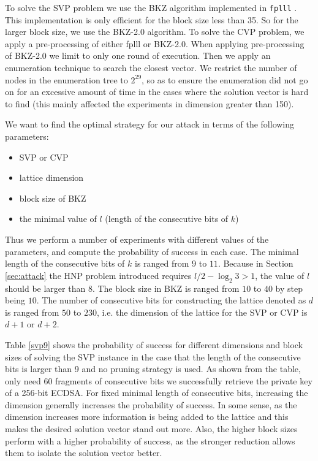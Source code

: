  To solve the SVP problem we use the BKZ algorithm implemented in \verb+fplll+ \cite{fplll}.
This implementation is only efficient for the block size less than 35.
So for the larger block size, we use the BKZ-2.0 \cite{bkz2} algorithm.
To solve the CVP problem, we apply a pre-processing of either fplll or BKZ-2.0.
When applying pre-processing of BKZ-2.0 we limit to only one round of execution.
Then we apply an enumeration technique to search the closest vector.
We restrict the number of nodes in the enumeration tree to $2^{29}$,
   so as to ensure the enumeration did not go on for an excessive amount of time in the cases where the solution vector is hard to find (this mainly affected the experiments in dimension greater than 150).

We want to find the optimal strategy for our attack in terms of the following parameters:
\begin{itemize}
 \item  SVP or CVP
 \item  lattice dimension
 \item  block size of BKZ
 \item  the minimal value of $l$ (length of the consecutive bits of $k$)
\end{itemize}

Thus we perform a number of experiments with different values of the parameters,
and compute the probability of success in each case.
The minimal length of the consecutive bits of $k$ is ranged from $9$ to $11$.
Because in Section \ref{sec:attack} the HNP problem introduced requires $l/2 - \log_{2}{3} > 1$, the value of $l$ should be larger than $8$.
The block size in BKZ is ranged from $10$ to $40$ by step being $10$.
The number of consecutive bits for constructing the lattice denoted as $d$ is ranged from $50$ to $230$,
i.e. the dimension of the lattice for the SVP or CVP is $d + 1$ or $d + 2$.

Table \ref{svp9} shows the probability of success for different dimensions and block sizes of solving the SVP instance in the
             case that the length of the consecutive bits is larger than 9 and no pruning strategy is used.
As shown from the table, only need $60$ fragments of consecutive bits we successfully retrieve the private key of a 256-bit ECDSA.
  For fixed  minimal length of consecutive bits,
 increasing the dimension generally increases the probability of success.
In some sense, as the dimension increases
     more information is being added to the lattice and this makes the desired solution vector stand out more.
Also, the higher block sizes perform with a higher probability of success,
 as the stronger reduction allows them to isolate the solution vector better.

